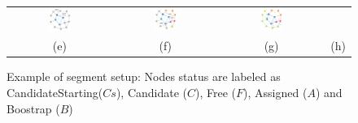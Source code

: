 \begin{figure}
\begin{tabular}{cccc}
\includegraphics[width=0.23\textwidth]{pictures/seq06.eps} &
\includegraphics[width=0.23\textwidth]{pictures/seq07.eps} & 
\includegraphics[width=0.23\textwidth]{pictures/seq08.eps} \\
(e) & (f) & (g) & (h) \\
\end{tabular}
\caption{Example of \disr{} segment setup: Nodes status are labeled as CandidateStarting($Cs$), Candidate ($C$), Free ($F$), Assigned ($A$) and Boostrap ($B$)}
\label{fig:disr_events}
\end{figure}

